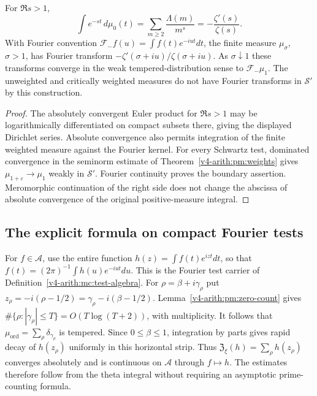 \begin{proposition}
\label{v4-arith:pm:laplace}
For $\Re s>1$,
\[
 \int e^{-st}\,d\mu_0(t)
 =\sum_{m\geq2}\frac{\Lambda(m)}{m^s}
 =-\frac{\zeta'(s)}{\zeta(s)}.
\]
With Fourier convention $\mathcal F_-f(u)=\int f(t)e^{-iut}dt$,
the finite measure $\mu_\sigma$, $\sigma>1$, has Fourier transform
$-\zeta'(\sigma+iu)/\zeta(\sigma+iu)$.
As $\sigma\downarrow1$ these transforms converge in the weak
tempered-distribution sense to $\mathcal F_-\mu_1$.
The unweighted and critically weighted measures do not have Fourier
transforms in $\mathscr S'$ by this construction.
\end{proposition}
\begin{proof}
The absolutely convergent Euler product for $\Re s>1$ may be
logarithmically differentiated on compact subsets there, giving
the displayed Dirichlet series. Absolute convergence also permits
integration of the finite weighted measure against the Fourier
kernel. For every Schwartz test, dominated convergence in the
seminorm estimate of Theorem~\ref{v4-arith:pm:weights} gives
$\mu_{1+\varepsilon}\to\mu_1$ weakly in $\mathscr S'$.
Fourier continuity proves the boundary assertion. Meromorphic
continuation of the right side does not change the abscissa of
absolute convergence of the original positive-measure integral.
\end{proof}

\subsection{The explicit formula on compact Fourier tests}
\label{v4-arith:pm:explicit-section}

For $f\in\mathscr A$, use the entire function
$h(z)=\int f(t)e^{izt}dt$, so that
$f(t)=(2\pi)^{-1}\int h(u)e^{-iut}du$.
This is the Fourier test carrier of
Definition~\ref{v4-arith:mc:test-algebra}.
For $\rho=\beta+i\gamma_\rho$ put
$z_\rho=-i(\rho-1/2)=\gamma_\rho-i(\beta-1/2)$.
Lemma~\ref{v4-arith:pm:zero-count} gives
$\#\{\rho:|\gamma_\rho|\leq T\}=O(T\log(T+2))$, with multiplicity.
It follows that $\mu_{\mathrm{ord}}=\sum_\rho\delta_{\gamma_\rho}$
is tempered. Since $0\leq\beta\leq1$, integration by parts gives rapid
decay of $h(z_\rho)$ uniformly in this horizontal strip.
Thus $\mathfrak Z_\xi(h)=\sum_\rho h(z_\rho)$ converges absolutely
and is continuous on $\mathscr A$ through $f\mapsto h$.
The estimates therefore follow from the theta integral without
requiring an asymptotic prime-counting formula.

